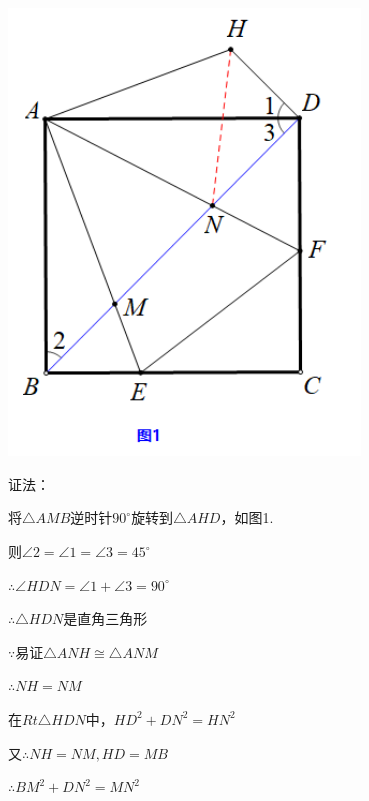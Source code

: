 {\kaishu\color{blue}
\begin{minipage}[h]{0.4\textwidth}
	\centering
	\includegraphics[width=0.7\textwidth]{figure/banjiao12}
\end{minipage}
\quad
\begin{minipage}[h]{0.6\textwidth}
证法：

将$\triangle AMB$逆时针$90^\circ$旋转到$\triangle AHD$，如图1.

则$\angle 2=\angle 1=\angle 3=45^\circ$

$\therefore \angle HDN=\angle 1+\angle 3=90^\circ$

$\therefore \triangle HDN$是直角三角形

$\because$易证$\triangle ANH\cong \triangle ANM$

$\therefore NH=NM$

在$Rt\triangle HDN$中，$HD^2+DN^2=HN^2$

又$\therefore NH=NM,HD=MB$

$\therefore BM^2+DN^2=MN^2$
\end{minipage}



}
